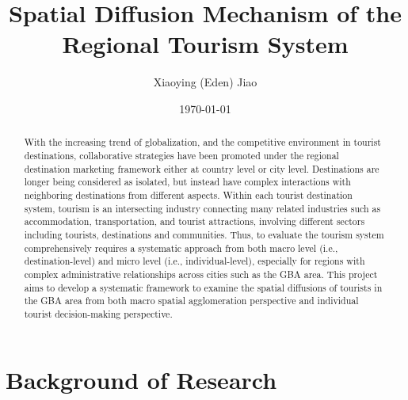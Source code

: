 \documentclass[11pt,a4paper]{amsart}
\theoremstyle{plain}
\theoremstyle{definition}
\begin{document}
\title{S\lowercase{patial} D\lowercase{iffusion} M\lowercase{echanism of the} R\lowercase{egional} T\lowercase{ourism} S\lowercase{ystem}}
\author{ X\lowercase{iaoying} (E\lowercase{den}) J\lowercase{iao}}
\date{\today}
		
\begin{abstract}
	With the increasing trend of globalization, and the competitive environment in tourist destinations, collaborative strategies have been promoted under the regional destination marketing framework either at country level or city level. Destinations are longer being considered as isolated, but instead have complex interactions with neighboring destinations from different aspects. Within each tourist destination system, tourism is an intersecting industry connecting many related industries such as accommodation, transportation, and tourist attractions, involving different sectors including tourists, destinations and communities. Thus, to evaluate the tourism system comprehensively requires a systematic approach from both macro level (i.e., destination-level) and micro level (i.e., individual-level), especially for regions with complex administrative relationships across cities such as the GBA area. This project aims to develop a systematic framework to examine the spatial diffusions of tourists in the GBA area from both macro spatial agglomeration perspective and individual tourist decision-making perspective.
\end{abstract}
		
\maketitle

\tableofcontents
\newpage

\section{Background of Research}
\end{document}
